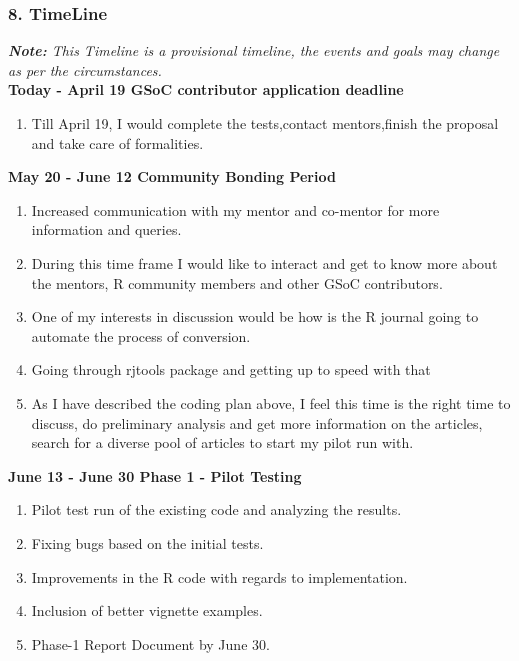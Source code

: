 \documentclass[12pt]{article}
\begin{document}
 \subsubsection{8. TimeLine}
 {\textit{\textbf{Note:} This Timeline is a provisional timeline, the events and goals may change as per the circumstances.}}\\
{\large\bfseries {\color{orange}Today - April 19}  GSoC contributor application deadline}
\begin{enumerate}[label = {  \color{MediumBlue} \textbf{\arabic*. }},align=left]
\item Till April 19, I would complete the tests,contact mentors,finish the  proposal and take care of  formalities.
\end{enumerate}
{\large\bfseries {\color{orange}May 20 - June 12}  Community Bonding Period }
\begin{enumerate}[label = {  \color{MediumBlue} \textbf{\arabic*. }},align=left]
\item Increased communication with my mentor and co-mentor for more information and queries.
\item During this time frame I would like to interact and get to know more about the mentors, R community members and other GSoC contributors. 
\item One of my interests in discussion would be how is the R journal going to automate the process of conversion.
\item Going through rjtools package and getting up to speed with that
\item As I have described the coding plan above, I feel this time is the right time to discuss, do preliminary analysis and get more information on the articles, search for a diverse pool of articles to start my pilot run with. 
 \end{enumerate}
{\large\bfseries  {\color{orange}June 13 - June 30} Phase 1 - Pilot Testing}
\begin{enumerate}[label = {  \color{MediumBlue} \textbf{\arabic*. }},align=left]
\item Pilot test run of the existing code and analyzing the results.
\item Fixing bugs based on the initial tests.
\item Improvements in the R code with regards to implementation.
\item Inclusion of better vignette examples. 
\item Phase-1 Report Document by June 30.
\end{enumerate}
\end{document}
